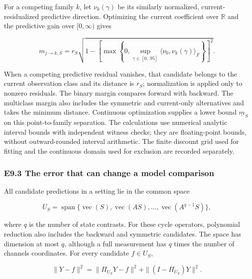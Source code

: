 \documentclass[11pt,a4paper]{article}
\begin{document}
\par
\noindent\begin{minipage}{\linewidth}

For a competing family \(k\), let \(\nu_k(\gamma)\) be its similarly
normalized, current-residualized predictive direction. Optimizing the
current coefficient over \(\mathbb R\) and the predictive gain over
\([0,\infty)\) gives

\[
m_{j\rightarrow k,S}
=r_S\sqrt{1-\left[\max\left\{0,
\sup_{\gamma\in[0,.95]}\langle\nu_0,\nu_k(\gamma)\rangle_F
\right\}\right]^2}.
\]

\end{minipage}\par

When a competing predictive residual vanishes, that candidate belongs to
the current observation class and its distance is \(r_S\); normalization
is applied only to nonzero residuals. The binary margin compares forward
with backward. The multiclass margin also includes the symmetric and
current-only alternatives and takes the minimum distance. Continuous
optimization supplies a lower bound \(\underline m_S\) on this
point-to-family separation. The calculations use numerical analytic
interval bounds with independent witness checks; they are floating-point
bounds, without outward-rounded interval arithmetic. The finite discount
grid used for fitting and the continuous domain used for exclusion are
recorded separately.

\subsubsection{E9.3 The error that can change a model
comparison}\label{e9.3-the-error-that-can-change-a-model-comparison}

\par
\noindent\begin{minipage}{\linewidth}

All candidate predictions in a setting lie in the common space

\[
U_S=\operatorname{span}\{\operatorname{vec}(S),
\operatorname{vec}(AS),\ldots,\operatorname{vec}(A^{q-1}S)\},
\]

\end{minipage}\par

\par
\noindent\begin{minipage}{\linewidth}

where \(q\) is the number of state contrasts. For these cycle operators,
polynomial reduction also includes the backward and symmetric
candidates. The space has dimension at most \(q\), although a full
measurement has \(q\) times the number of channels coordinates. For
every candidate \(f\in U_S\),

\[
\|Y-f\|^2=\|\Pi_{U_S}Y-f\|^2+
\|(I-\Pi_{U_S})Y\|^2.
\]

\end{minipage}\par
\end{document}
